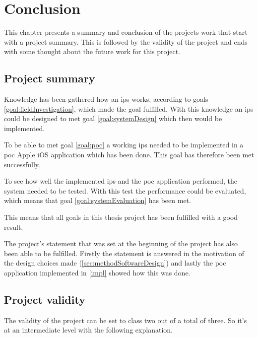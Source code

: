 \chapter{Conclusion}\label{conclusion}
This chapter presents a summary and conclusion of the projects work that start with a project summary.
This is followed by the validity of the project and ends with some thought about the future work for this project.


\section{Project summary}\label{sec:conclusionProjectSummary}
Knowledge has been gathered how an \acrfull{ips} works, according to goals \ref{goal:fieldInvestigation}, which made the goal fulfilled.
With this knowledge an \acrshort{ips} could be designed to met goal \ref{goal:systemDesign} which then would be implemented.

\bigskip

To be able to met goal \ref{goal:poc} a working \acrshort{ips} needed to be implemented in a \acrfull{poc} Apple iOS application which has been done.
This goal has therefore been met successfully.

\bigskip

To see how well the implemented \acrshort{ips} and the \acrshort{poc} application performed, the system needed to be tested.
With this test the performance could be evaluated, which means that goal \ref{goal:systemEvaluation} has been met.

\bigskip

This means that all goals in this thesis project has been fulfilled with a good result.

\bigskip

The project's statement that was set at the beginning of the project has also been able to be fulfilled.
Firstly the statement is answered in the motivation of the design choices made (\cref{sec:methodSoftwareDesign}) and lastly the \acrshort{poc} application implemented in \cref{impl} showed how this was done.


\section{Project validity}\label{sec:conclusionProjectValidity}
The validity of the project can be set to class two out of a total of three.
So it's at an intermediate level with the following explanation.

\bigskip

